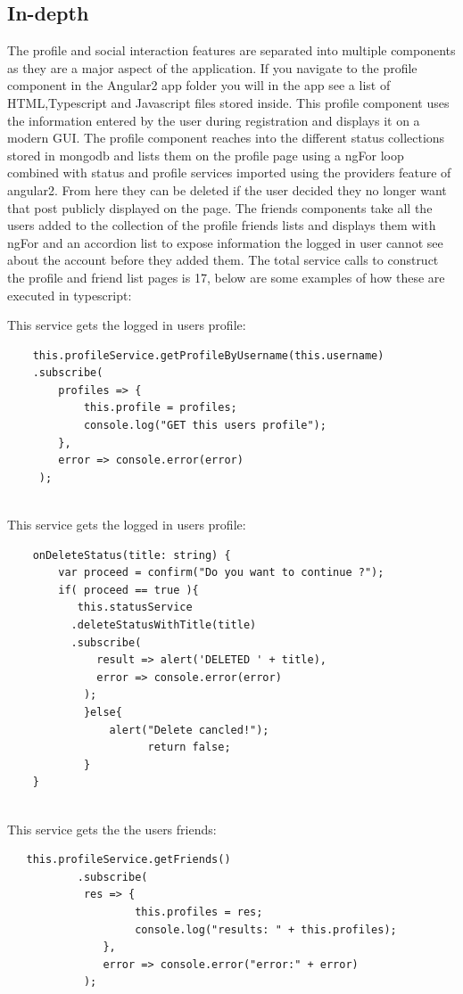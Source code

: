 \subsection{In-depth}
The profile and social interaction features are separated into multiple components as they are a major aspect of the application. If you navigate to the profile component in the Angular2 app folder you will  in the app see a list of HTML,Typescript and Javascript files stored inside. This profile component uses the information entered by the user during registration and displays it on a modern GUI. The profile component reaches into the different status collections stored in mongodb and lists them on the profile page using a ngFor loop combined with status and profile services imported using the providers feature of angular2. From here they can be deleted if the user decided they no longer want that post publicly displayed on the page. The friends components take all the users added to the collection of the profile friends lists and displays them with ngFor and an accordion list to expose information the logged in user cannot see about the account before they added them. The total service calls to construct the profile and friend list pages is 17, below are some examples of how these are executed in typescript:

This service gets the logged in users profile:
\begin{lstlisting}
    this.profileService.getProfileByUsername(this.username)
    .subscribe(
        profiles => {
            this.profile = profiles;
            console.log("GET this users profile");  
        },
        error => console.error(error)
     );
    
\end{lstlisting}

This service gets the logged in users profile:
\begin{lstlisting}
    onDeleteStatus(title: string) {
        var proceed = confirm("Do you want to continue ?");
        if( proceed == true ){
           this.statusService
          .deleteStatusWithTitle(title)
          .subscribe(
              result => alert('DELETED ' + title),
              error => console.error(error)
            );
            }else{
                alert("Delete cancled!");
                      return false;
            }
    }
  
\end{lstlisting}

This service gets the the users friends:
\begin{lstlisting}
   this.profileService.getFriends()
           .subscribe(
            res => {
                    this.profiles = res;
                    console.log("results: " + this.profiles);
               },
               error => console.error("error:" + error)
            );
  
\end{lstlisting}

